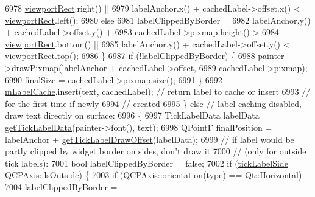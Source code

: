 \begin{DoxyCode}
6978                 \hyperlink{class_q_c_p_axis_painter_private_a8627dc6b40781e3291bb508e4ac574d6}{viewportRect}.right() ||
6979             labelAnchor.x() + cachedLabel->offset.x() < \hyperlink{class_q_c_p_axis_painter_private_a8627dc6b40781e3291bb508e4ac574d6}{viewportRect}.left();
6980       \textcolor{keywordflow}{else}
6981         labelClippedByBorder =
6982             labelAnchor.y() + cachedLabel->offset.y() +
6983                     cachedLabel->pixmap.height() >
6984                 \hyperlink{class_q_c_p_axis_painter_private_a8627dc6b40781e3291bb508e4ac574d6}{viewportRect}.bottom() ||
6985             labelAnchor.y() + cachedLabel->offset.y() < \hyperlink{class_q_c_p_axis_painter_private_a8627dc6b40781e3291bb508e4ac574d6}{viewportRect}.top();
6986     \}
6987     \textcolor{keywordflow}{if} (!labelClippedByBorder) \{
6988       painter->drawPixmap(labelAnchor + cachedLabel->offset,
6989                           cachedLabel->pixmap);
6990       finalSize = cachedLabel->pixmap.size();
6991     \}
6992     \hyperlink{class_q_c_p_axis_painter_private_a07ac270ea0c0ae084debd48d6a740e35}{mLabelCache}.insert(text, cachedLabel); \textcolor{comment}{// return label to cache or insert}
6993                                            \textcolor{comment}{// for the first time if newly}
6994                                            \textcolor{comment}{// created}
6995   \} \textcolor{keywordflow}{else} \textcolor{comment}{// label caching disabled, draw text directly on surface:}
6996   \{
6997     TickLabelData labelData = \hyperlink{class_q_c_p_axis_painter_private_ad9f24fbcbf9d8c92b34d9d00b010e6a3}{getTickLabelData}(painter->font(), text);
6998     QPointF finalPosition = labelAnchor + \hyperlink{class_q_c_p_axis_painter_private_a6b02e6fd70cc65f726ca8cb3e6f16de4}{getTickLabelDrawOffset}(labelData);
6999     \textcolor{comment}{// if label would be partly clipped by widget border on sides, don't draw it}
7000     \textcolor{comment}{// (only for outside tick labels):}
7001     \textcolor{keywordtype}{bool} labelClippedByBorder = \textcolor{keyword}{false};
7002     \textcolor{keywordflow}{if} (\hyperlink{class_q_c_p_axis_painter_private_a9d27f7625fcfbeb3a60193d0c18fc7e9}{tickLabelSide} == \hyperlink{class_q_c_p_axis_a24b13374b9b8f75f47eed2ea78c37db9a2eadb509fc0c9a8b35b85c86ec9f3c7a}{QCPAxis::lsOutside}) \{
7003       \textcolor{keywordflow}{if} (\hyperlink{class_q_c_p_axis_a57483f2f60145ddc9e63f3af53959265}{QCPAxis::orientation}(\hyperlink{class_q_c_p_axis_painter_private_ae04594e97417336933d807c86d353098}{type}) == Qt::Horizontal)
7004         labelClippedByBorder =

\end{DoxyCode}
